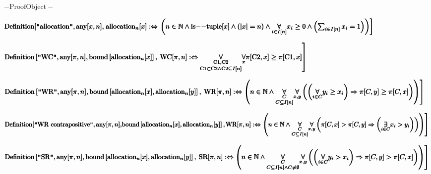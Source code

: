 \documentclass{article}
\begin{document}
\noindent\(- \text{ProofObject} -\)

\noindent\(\pmb{\text{Definition}[\text{$\texttt{"}$allocation$\texttt{"}$}, \text{any}[x,n], }\\
\pmb{\text{allocation}_n[x] :\Leftrightarrow  }\\
\pmb{\left.\left(n\in \mathbb{N}\land \text{is$--$tuple}[x]\land  (|x|=n)\land  \underset{i\in I[n]}{\forall }x_i\geq 0 \land \left(\sum _{i\in I[n]}
x_i = 1\right)\right)\right]}\)

\noindent\(\pmb{}\\
\pmb{\text{Definition}\left[\text{$\texttt{"}$WC$\texttt{"}$}, \text{any}[\pi ,n],\text{bound}\left[\text{allocation}_n[x]\right],\right.}\\
\pmb{\left.\text{WC}[\pi ,n] :\Leftrightarrow \underset{\text{C1} \subset  \text{C2} \land  \text{C2}\subseteq I[n]}{\underset{\text{C1},\text{C2}}{\forall
}}\underset{x}{\forall }\pi [\text{C2},x]\geq \pi [\text{C1},x]\right] }\)

\noindent\(\pmb{}\\
\pmb{\text{Definition}\left[\text{$\texttt{"}$WR$\texttt{"}$}, \text{any}[\pi ,n],\text{bound}\left[\text{allocation}_n[x], \text{allocation}_n[y]\right],\right.}\\
\pmb{\left.\text{WR}[\pi ,n] :\Leftrightarrow \left(n\in \mathbb{N}\land \underset{C\subseteq I[n]}{\underset{C}{\forall }}\underset{x,y}{\forall
}\left(\left(\underset{i\in C}{\forall }y_i\geq  x_i\right)\Rightarrow \pi [C,y]\geq \pi [C,x]\right)\right)\right] }\)

\noindent\(\pmb{\text{Definition}[\text{$\texttt{"}$WR contrapositive$\texttt{"}$}, \text{any}[\pi ,n],}\\
\pmb{\text{bound}\left[\text{allocation}_n[x], \text{allocation}_n[y]\right],}\\
\pmb{\left.\text{WR}[\pi ,n] :\Leftrightarrow \left(n\in \mathbb{N}\land \underset{C\subseteq I[n]}{\underset{C}{\forall }}\underset{x,y}{\forall
}\left(\pi [C,x]>\pi [C,y]\Rightarrow \left(\underset{i\in C}{\exists }x_i> y_i\right)\right)\right)\right]}\)

\noindent\(\pmb{}\\
\pmb{\text{Definition}\left[\text{$\texttt{"}$SR$\texttt{"}$}, \text{any}[\pi ,n],\text{bound}\left[\text{allocation}_n[x] , \text{allocation}_n[y]\right],\right.}\\
\pmb{\left.\text{SR}[\pi ,n] :\Leftrightarrow \left(n\in \mathbb{N}\land \underset{C\subseteq I[n]\land C\neq \emptyset }{\underset{C}{\forall }}\underset{x,y}{\forall
}\left(\left(\underset{i\in C}{\forall }y_i> x_i\right)\Rightarrow \pi [C,y]>\pi [C,x]\right)\right)\right] }\)
\end{document}

